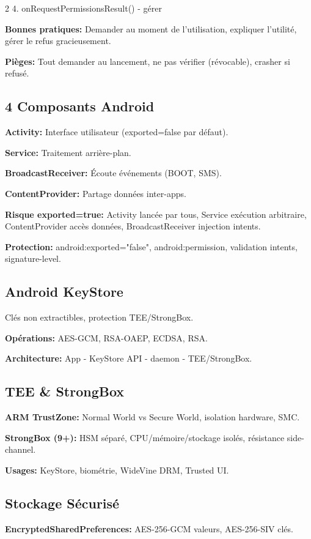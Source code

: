 \documentclass[9pt,a4paper]{extarticle}
\begin{document}
\begin{multicols}{2}
4. onRequestPermissionsResult() - gérer

\textbf{Bonnes pratiques:} Demander au moment de l'utilisation, expliquer l'utilité, gérer le refus gracieusement.

\textbf{Pièges:} Tout demander au lancement, ne pas vérifier (révocable), crasher si refusé.

\subsection*{4 Composants Android}
\textbf{Activity:} Interface utilisateur (exported=false par défaut).

\textbf{Service:} Traitement arrière-plan.

\textbf{BroadcastReceiver:} Écoute événements (BOOT, SMS).

\textbf{ContentProvider:} Partage données inter-apps.

\textbf{Risque exported=true:} Activity lancée par tous, Service exécution arbitraire, ContentProvider accès données, BroadcastReceiver injection intents.

\textbf{Protection:} android:exported="false", android:permission, validation intents, signature-level.

\subsection*{Android KeyStore}
Clés non extractibles, protection TEE/StrongBox.

\textbf{Opérations:} AES-GCM, RSA-OAEP, ECDSA, RSA.

\textbf{Architecture:} App - KeyStore API - daemon - TEE/StrongBox.

\subsection*{TEE \& StrongBox}
\textbf{ARM TrustZone:} Normal World vs Secure World, isolation hardware, SMC.

\textbf{StrongBox (9+):} HSM séparé, CPU/mémoire/stockage isolés, résistance side-channel.

\textbf{Usages:} KeyStore, biométrie, WideVine DRM, Trusted UI.

\subsection*{Stockage Sécurisé}
\textbf{EncryptedSharedPreferences:} AES-256-GCM valeurs, AES-256-SIV clés.


\end{multicols}
\end{document}
